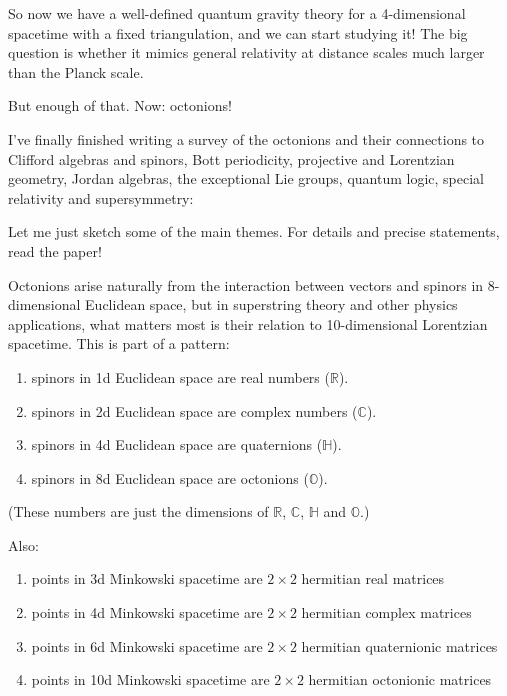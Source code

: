 \documentclass{article}
\def\tightlist{}
\renewcommand{\texttt}[1]{%
  \begingroup
  \ttfamily
  \begingroup\lccode`~=`/\lowercase{\endgroup\def~}{/\discretionary{}{}{}}%
  \begingroup\lccode`~=`[\lowercase{\endgroup\def~}{[\discretionary{}{}{}}%
  \begingroup\lccode`~=`.\lowercase{\endgroup\def~}{.\discretionary{}{}{}}%
  \catcode`/=\active\catcode`[=\active\catcode`.=\active
  \scantokens{#1\noexpand}%
  \endgroup
}
\begin{document}
So now we have a well-defined quantum gravity theory for a 4-dimensional
spacetime with a fixed triangulation, and we can start studying it! The
big question is whether it mimics general relativity at distance scales
much larger than the Planck scale.

But enough of that. Now: octonions!

I've finally finished writing a survey of the octonions and their
connections to Clifford algebras and spinors, Bott periodicity,
projective and Lorentzian geometry, Jordan algebras, the exceptional Lie
groups, quantum logic, special relativity and supersymmetry:


Let me just sketch some of the main themes. For details and precise
statements, read the paper!

Octonions arise naturally from the interaction between vectors and
spinors in 8-dimensional Euclidean space, but in superstring theory and
other physics applications, what matters most is their relation to
10-dimensional Lorentzian spacetime. This is part of a pattern:

\begin{enumerate}
\def\labelenumi{\arabic{enumi})}
\tightlist
\item
  spinors in 1d Euclidean space are real numbers (\(\mathbb{R}\)).
\item
  spinors in 2d Euclidean space are complex numbers (\(\mathbb{C}\)).
\item
  spinors in 4d Euclidean space are quaternions (\(\mathbb{H}\)).
\item
  spinors in 8d Euclidean space are octonions (\(\mathbb{O}\)).
\end{enumerate}

(These numbers are just the dimensions of \(\mathbb{R}\),
\(\mathbb{C}\), \(\mathbb{H}\) and \(\mathbb{O}\).)

Also:

\begin{enumerate}
\def\labelenumi{\arabic{enumi})}
\tightlist
\item
  points in 3d Minkowski spacetime are \(2\times2\) hermitian real
  matrices
\item
  points in 4d Minkowski spacetime are \(2\times2\) hermitian complex
  matrices
\item
  points in 6d Minkowski spacetime are \(2\times2\) hermitian
  quaternionic matrices
\item
  points in 10d Minkowski spacetime are \(2\times2\) hermitian
  octonionic matrices
\end{enumerate}
\end{document}
